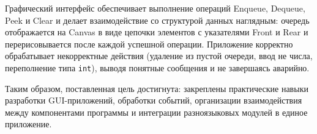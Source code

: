 \documentclass[oneside,a4paper,14pt]{extarticle} %
\begin{document}
Графический интерфейс обеспечивает выполнение операций Enqueue, Dequeue, Peek и Clear и делает взаимодействие со структурой данных наглядным: очередь отображается на Canvas в виде цепочки элементов с указателями Front и Rear и перерисовывается после каждой успешной операции. Приложение корректно обрабатывает некорректные действия (удаление из пустой очереди, ввод не числа, переполнение типа \texttt{int}), выводя понятные сообщения и не завершаясь аварийно.

Таким образом, поставленная цель достигнута: закреплены практические навыки разработки GUI-приложений, обработки событий, организации взаимодействия между компонентами программы и интеграции разноязыковых модулей в единое приложение.
\end{document}
